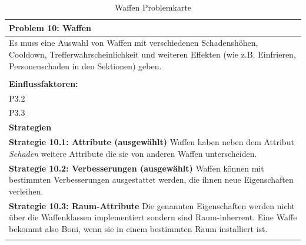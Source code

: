 \documentclass[fontsize=12pt,paper=a4,twoside]{scrartcl}
\begin{document}
\begin{table}[H]
    \centering
    \begin{tabular}{|p{15cm}|}
    \hline
          \textbf{Problem 10: Waffen}  \\ \hline
	Es muss eine Auswahl von Waffen mit verschiedenen Schadenshöhen, Cooldown, Trefferwahrscheinlichkeit und weiteren Effekten (wie z.B. Einfrieren, Personenschaden in den Sektionen) geben. \\
         \\ \hline
          \textbf{Einflussfaktoren: } \\
	P3.2 \\
	P3.3 \\
          \hline
          \textbf{Strategien} \\ \hline
            {}          
           \label{strategie:10.1}     
          \textbf{Strategie 10.1: Attribute  (ausgewählt)} Waffen haben neben dem Attribut \textit{Schaden} weitere Attribute die sie von anderen Waffen unterscheiden.  \\        
  {}          
           \label{strategie:10.2}              
          \textbf{Strategie 10.2: Verbesserungen  (ausgewählt)} Waffen können mit bestimmten Verbesserungen ausgestattet werden, die ihnen neue Eigenschaften verleihen.  \\
	 {}          
           \label{strategie:10.3}     
          \textbf{Strategie 10.3: Raum-Attribute} Die genannten Eigenschaften werden nicht über die Waffenklassen implementiert sondern sind Raum-inherrent. Eine Waffe bekommt also Boni, wenn sie in einem bestimmten Raum installiert ist.  \\ 
	 \\ \hline
    \end{tabular}

    \caption{Waffen Problemkarte}
    \label{tab:ProblemKarte10}
\end{table}
\end{document}
